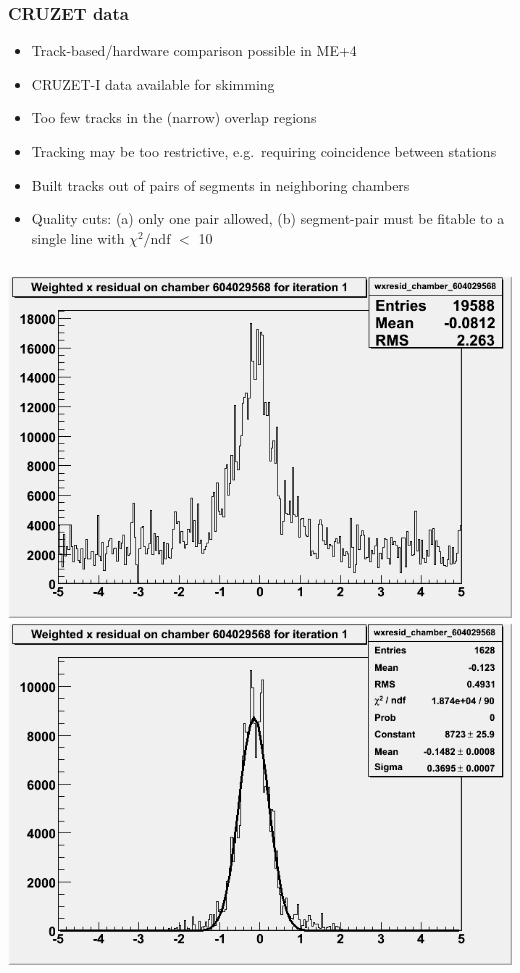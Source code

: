\documentclass[compress]{beamer}
\begin{document}
\begin{frame}
\frametitle{CRUZET data}

\begin{itemize}
\item Track-based/hardware comparison possible in ME+4
\item CRUZET-I data available for skimming
\item Too few tracks in the (narrow) overlap regions
\item Tracking may be too restrictive, e.g.\ requiring coincidence between stations
\item Built tracks out of pairs of segments in neighboring chambers
\item Quality cuts: (a) only one pair allowed, (b) segment-pair must be fitable to a single line with $\chi^2/\mbox{ndf}$ $<$ 10
\end{itemize}

\begin{columns}
\includegraphics[width=\linewidth]{wxresid_chamber_604029568.png}
\includegraphics[width=\linewidth]{wxresid_chamber_604029568_chi2cut.png}
\end{columns}
\end{frame}
\end{document}
